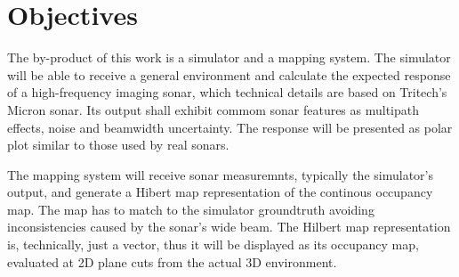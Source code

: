 

\section{Objectives}


The by-product of this work is a simulator and a mapping system. The simulator
will be able to receive a general environment and calculate the expected
response of a high-frequency imaging sonar, which technical details are based on
Tritech's Micron sonar. Its output shall exhibit commom sonar features as
multipath effects, noise and beamwidth uncertainty. The response will be
presented as polar plot similar to those used by real sonars.

The mapping system will receive sonar measuremnts, typically the simulator's
output, and generate a Hibert map representation of the continous occupancy map.
The map has to match to the simulator groundtruth avoiding inconsistencies
caused by the sonar's wide beam. The Hilbert map representation is, technically,
just a vector, thus it will be displayed as its occupancy map, evaluated at 2D
plane cuts from the actual 3D environment.




% 
% 

